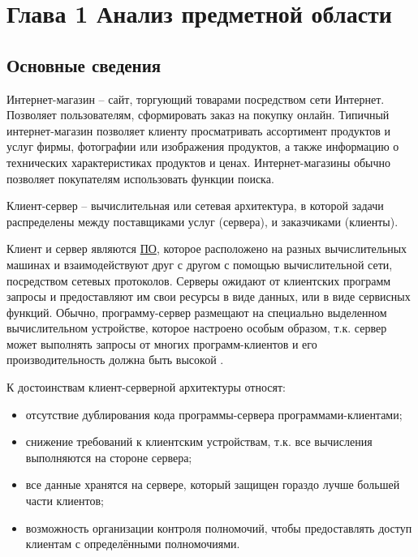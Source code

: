 \section[Глава 1 Анализ предметной области]{Глава 1 \break Анализ предметной области}
\label{sec:charpter-1-analisis}

\subsection{Основные сведения}\label{subsec:1-common-info}\indent

Интернет-магазин – сайт, торгующий товарами посредством сети Интернет.
Позволяет пользователям, сформировать заказ на покупку онлайн.
Типичный интернет-магазин позволяет клиенту просматривать ассортимент продуктов и услуг фирмы, фотографии или изображения продуктов, 
а также информацию о технических характеристиках продуктов и ценах.
Интернет-магазины обычно позволяет покупателям использовать функции поиска.

Клиент-сервер – вычислительная или сетевая архитектура, в которой задачи распределены между поставщиками услуг (сервера), и заказчиками (клиенты).

Клиент и сервер являются \hyperlink{gloss:software}{ПО}, которое расположено на разных вычислительных машинах и взаимодействуют друг с другом с помощью вычислительной сети, 
посредством сетевых протоколов.
Серверы ожидают от клиентских программ запросы и предоставляют им свои ресурсы в виде данных, или в виде сервисных функций.
Обычно, программу-сервер размещают на специально выделенном вычислительном устройстве, которое настроено особым образом, т.к. 
сервер может выполнять запросы от многих программ-клиентов и его производительность должна быть высокой \cite{client-server}.

К достоинствам клиент-серверной архитектуры относят:

\begin{itemize}
    \item отсутствие дублирования кода программы-сервера программами-клиентами;
    \item снижение требований к клиентским устройствам, т.к. все вычисления выполняются на стороне сервера;
    \item все данные хранятся на сервере, который защищен гораздо лучше большей части клиентов;
    \item возможность организации контроля полномочий, чтобы предоставлять доступ клиентам с определёнными полномочиями.
\end{itemize}

